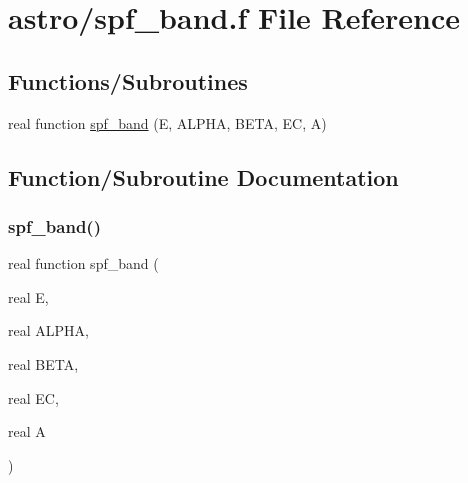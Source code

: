 \hypertarget{spf__band_8f}{}\section{astro/spf\+\_\+band.f File Reference}
\label{spf__band_8f}
\subsection*{Functions/\+Subroutines}
\begin{DoxyCompactItemize}
\item 
real function \hyperlink{spf__band_8f_ac412c3fc79e81a85d40331fe6c24032d}{spf\+\_\+band} (E, A\+L\+P\+HA, B\+E\+TA, EC, A)
\end{DoxyCompactItemize}


\subsection{Function/\+Subroutine Documentation}
\mbox{\label{spf__band_8f_ac412c3fc79e81a85d40331fe6c24032d}} 
\subsubsection{\texorpdfstring{spf\+\_\+band()}{spf\_band()}}
{\footnotesize\ttfamily real function spf\+\_\+band (\begin{DoxyParamCaption}\item[{real}]{E,  }\item[{real}]{A\+L\+P\+HA,  }\item[{real}]{B\+E\+TA,  }\item[{real}]{EC,  }\item[{real}]{A }\end{DoxyParamCaption})}

